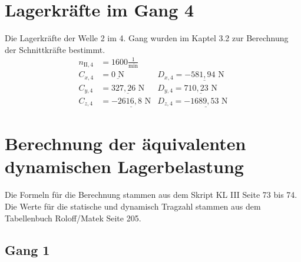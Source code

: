 \section{Lagerkräfte im Gang 4}
Die Lagerkräfte der Welle 2 im 4. Gang wurden im Kaptel 3.2 zur Berechnung der Schnittkräfte bestimmt.
\begin{align*}
	n_{\mathrm{II},4} &= 1600\frac{1}{\text{min}} \\
	C_{x,4} &= \underline{0\text{ N}} & D_{x,4}= \underline{-581,94\text{ N}}\\
	C_{y,4} &= \underline{327,26\text{ N}} & D_{y,4}= \underline{710,23\text{ N}}\\
	C_{z,4} &= \underline{-2616,8\text{ N}} & D_{z,4}= \underline{-1689,53\text{ N}}
\end{align*}
\section{Berechnung der äquivalenten dynamischen Lagerbelastung}
Die Formeln für die Berechnung stammen aus dem Skript KL III Seite 73 bis 74.
Die Werte für die statische und dynamisch Tragzahl stammen aus dem Tabellenbuch Roloff/Matek  Seite 205.
\subsection{Gang 1}
